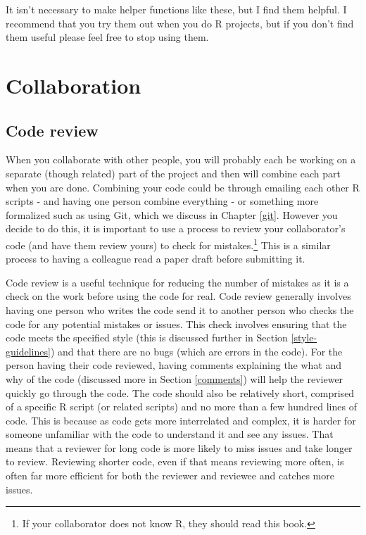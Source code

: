 \documentclass[
]{krantz}
\begin{document}
It isn't necessary to make helper functions like these, but
I find them helpful. I recommend that you try them out when
you do R projects, but if you don't find them useful please
feel free to stop using them.

\hypertarget{collaboration}{%
\chapter{Collaboration}\label{collaboration}}

\hypertarget{code-review}{%
\section{Code review}\label{code-review}}

When you collaborate with other people, you will probably
each be working on a separate (though related) part of the
project and then will combine each part when you are done.
Combining your code could be through emailing each other R
scripts - and having one person combine everything - or
something more formalized such as using Git, which we
discuss in Chapter \ref{git}. However you decide to do this,
it is important to use a process to review your
collaborator's code (and have them review yours) to check
for mistakes.\footnote{If your collaborator does not know R,
  they should read this book.} This is a similar process to
having a colleague read a paper draft before submitting it.

Code review is a useful technique for reducing the number of
mistakes as it is a check on the work before using the code
for real. Code review generally involves having one person
who writes the code send it to another person who checks the
code for any potential mistakes or issues. This check
involves ensuring that the code meets the specified style
(this is discussed further in Section
\ref{style-guidelines}) and that there are no bugs (which
are errors in the code). For the person having their code
reviewed, having comments explaining the what and why of the
code (discussed more in Section \ref{comments}) will help
the reviewer quickly go through the code. The code should
also be relatively short, comprised of a specific R script
(or related scripts) and no more than a few hundred lines of
code. This is because as code gets more interrelated and
complex, it is harder for someone unfamiliar with the code
to understand it and see any issues. That means that a
reviewer for long code is more likely to miss issues and
take longer to review. Reviewing shorter code, even if that
means reviewing more often, is often far more efficient for
both the reviewer and reviewee and catches more issues.
\end{document}

